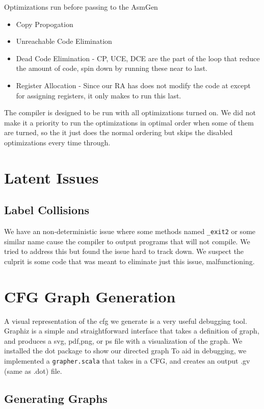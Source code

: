 \documentclass[11pt]{article}
\begin{document}
  Optimizations run before passing to the AsmGen

\begin{itemize}
\item Copy Propogation
\item Unreachable Code Elimination
\item Dead Code Elimination - CP, UCE, DCE are the part of the loop that reduce the amount of code, spin down by running these near to last.
\item Register Allocation - Since our RA has does not modify the code at except for assigning registers, it only makes to run this last.
\end{itemize}
  The compiler is designed to be run with all optimizations turned on.
  We did not make it a priority to run the optimizations in optimal order when some of them are turned,
  so the it just does the normal ordering but skips the disabled optimizations every time through.

\section{Latent Issues}
\label{sec-3}

\subsection{Label Collisions}
\label{sec-3.1}

  We have an non-deterministic issue where some methods named \texttt{\_exit2} or some similar name cause the compiler to output programs that will not compile.
  We tried to address this but found the issue hard to track down. We suspect the culprit is some code that was meant to eliminate just this issue, malfunctioning.

\section{CFG Graph Generation}
\label{sec-4}

    A visual representation of the cfg we generate is a very useful debugging tool. 
    Graphiz is a simple and straightforward interface that takes a definition of graph, and
    produces a svg, pdf,png, or ps file with a visualization of the graph.
    We installed the dot package to show our directed graph
    To aid in debugging, we implemented a \texttt{grapher.scala} that takes in a CFG,
    and creates an output .gv (same as .dot) file.

\subsection{Generating Graphs}
\label{sec-4.1}
\end{document}
